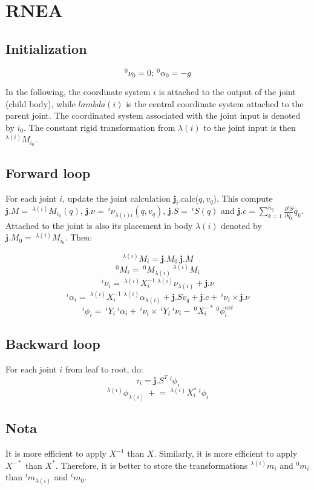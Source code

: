 \documentclass[11pt,twoside,a4paper]{article}
\newcommand{\dpartial}[2]{\frac{\partial{#1}}{\partial{#2}}}
\begin{document}
\section{RNEA}

\subsection{Initialization} 
$$^0\nu_0 = 0 ; \ ^0\alpha_0 = -g$$

In the following, the coordinate system $i$ is attached to the output of the joint (child body), while $lambda(i)$ is the central coordinate system attached to the parent joint. The coordinated system associated with the joint input is denoted by $i_0$. The constant rigid transformation from $\lambda(i)$ to the joint input is then $^{\lambda(i)}M_{i_0}$.


\subsection{Forward loop} 
For each joint $i$, update the joint calculation $\mathbf j_i$.calc($q,v_q$). This compute $\mathbf{j}.M = \ ^{\lambda(i)}M_{i_0}(q)$, $\mathbf{j}.\nu = \ ^i\nu_{{\lambda(i)}i}(q,v_q)$, $\mathbf{j}.S = \ ^iS(q)$  and $\mathbf{j}.c = \sum_{k=1}^{n_q} \dpartial{^iS}{q_k} \dot q_k$. Attached to the joint is also its placement in body $\lambda(i)$ denoted by $\mathbf{j}.M_0 =\ ^{\lambda(i)}M_{i_0}$. Then:

$$^{\lambda(i)}M_i = \mathbf{j}.M_0 \ \mathbf{j}.M $$
$$^0M_i = \ ^0M_{\lambda(i)} \ ^{\lambda(i)}M_i$$
$$^i\nu_{i}= \ ^{\lambda(i)}X_i^{-1} \ ^{\lambda(i)}\nu_{{\lambda(i)}} + \mathbf{j}.\nu$$
$$^i\alpha_{i}= \ ^{\lambda(i)}X_i^{-1} \  ^{\lambda(i)}\alpha_{{\lambda(i)}} + \mathbf{j}.S \dot v_q + \mathbf{j}.c +  \ ^i\nu_{i} \times  \mathbf{j}.\nu$$
$$^i\phi_i= \ ^iY_i \ ^i\alpha_i + \ ^i\nu_i \times \ ^iY_i \ ^i\nu_i - \ ^0X_i^{-*}\ ^0\phi_i^{ext}$$

\subsection{Backward loop} 
For each joint $i$ from leaf to root, do:
$$\tau_i = \mathbf{j}.S^T \ ^i\phi_i$$
$$^{\lambda(i)}\phi_{\lambda(i)} \ +\!\!= \ ^{\lambda(i)}X_i^{*} \ ^i\phi_i$$

\subsection{Nota}
It is more efficient to apply $X^{-1}$ than $X$. Similarly, it is more efficient to apply $X^{-*}$ than $X^*$. Therefore, it is better to store the transformations $^{\lambda(i)}m_i$ and $^0m_i$ than $^im_{\lambda(i)}$ and $^im_0$.
\end{document}
